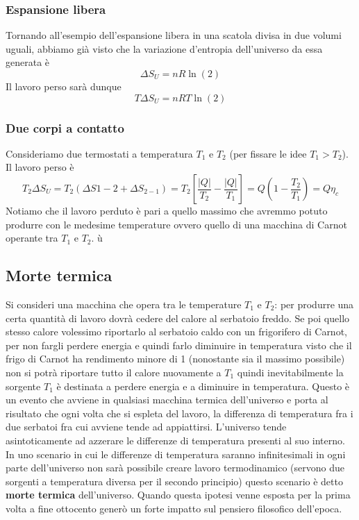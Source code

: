 \documentclass[
10pt, %
a4paper, %
oneside, %
headinclude,footinclude, %
BCOR5mm, %
]{scrartcl}
\begin{document}
\subsubsection*{Espansione libera}
Tornando all'esempio dell'espansione libera in una scatola divisa in due volumi uguali, abbiamo già visto che la variazione d'entropia dell'universo da essa generata è \[\Delta S_U = n R \ln(2)\]
Il lavoro perso sarà dunque \[T\Delta S_U = n R T \ln(2)\]
\subsubsection*{Due corpi a contatto}
Consideriamo due termostati a temperatura \(T_1\) e \(T_2\) (per fissare le idee \(T_1 > T_2\)). Il lavoro perso è 
\[T_2 \Delta S_U = T_2(\Delta S{1-2}+\Delta S_{2-1})=T_2\left[\frac{|Q|}{T_2}-\frac{|Q|}{T_1}\right] = Q\left(1-\frac{T_2}{T_1}\right) =Q\eta_c\]
Notiamo che il lavoro perduto è pari a quello massimo che avremmo potuto produrre con le medesime temperature ovvero quello di una macchina di Carnot operante tra \(T_1\) e \(T_2\). ù
\subsection{Morte termica}
Si consideri una macchina che opera tra le temperature \(T_1\) e \(T_2\): per produrre una certa quantità di lavoro dovrà cedere del calore al serbatoio freddo. Se poi quello stesso calore volessimo riportarlo al serbatoio caldo con un frigorifero di Carnot, per non fargli perdere energia e quindi farlo diminuire in temperatura visto che il frigo di Carnot ha rendimento minore di 1 (nonostante sia il massimo possibile) non si potrà riportare tutto il calore nuovamente a \(T_1\) quindi inevitabilmente la sorgente \(T_1\) è destinata a perdere energia e a diminuire in temperatura. Questo è un evento che avviene in qualsiasi macchina termica dell'universo e porta al risultato che ogni volta che si espleta del lavoro, la differenza di temperatura fra i due serbatoi fra cui avviene tende ad appiattirsi. L'universo tende asintoticamente ad azzerare le differenze di temperatura presenti al suo interno. In uno scenario in cui le differenze di temperatura saranno infinitesimali in ogni parte dell'universo non sarà possibile creare lavoro termodinamico (servono due sorgenti a temperatura diversa per il secondo principio) questo scenario è detto \textbf{morte termica} dell'universo. Quando questa ipotesi venne esposta per la prima volta a fine ottocento generò un forte impatto sul pensiero filosofico dell'epoca. 
\end{document}
